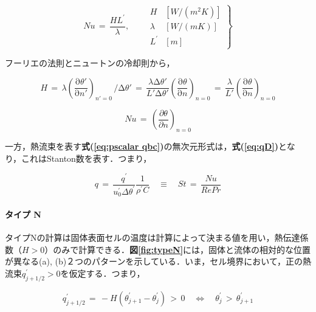 \begin{equation}
Nu \,=\, \frac{HL^{\prime}}{\lambda}, \qquad \left.
\begin{array}{ll}
H & [W/(m^2K)]\\
\lambda & [W/(mK)]\\
L^\prime & [m]
\end{array} \right\}
\label{eq:nu_1}
\end{equation}

フーリエの法則とニュートンの冷却則から，

\begin{equation}
{H} \,=\, \lambda {\left({\frac{\mathrm{\partial}{\mathit{\theta}}'}{\mathrm{\partial}{n}'}}\right)}_{{n}'\mathrm{{=}}{0}}\, \Bigg/ {\mathrm{\Delta}{\mathit{\theta}}'}
\,=\,
\frac{{\mathit{\lambda}}\mathrm{\Delta}{\mathit{\theta}}'}{{L}'\mathrm{\Delta}{\mathit{\theta}}'}{\left({\frac{\mathrm{\partial}\mathit{\theta}}{\mathrm{\partial}{n}}}\right)}_{{n}\mathrm{{=}}{0}}
\,=\,
\frac{{\mathit{\lambda}}}{{L}'}{\left({\frac{\mathrm{\partial}\mathit{\theta}}{\mathrm{\partial}{n}}}\right)}_{{n}\mathrm{{=}}{0}}
\label{eq:nu_2}
\end{equation}

\begin{equation}
Nu \,=\, \left( \frac{\partial \theta}{\partial n} \right)_{n=0}
\label{eq:nu_3}
\end{equation}

一方，熱流束を表す\textbf{式(\ref{eq:pscalar qbc})}の無次元形式は，\textbf{式(\ref{eq:qD})}となり，これはStanton数を表す．つまり，

\begin{equation}
q \,=\, \frac{q^\prime}{u_{\mathit 0}^\prime \Delta \theta^\prime} \frac{1}{\rho^\prime C}
\quad \equiv \quad 
St\,=\, \frac{Nu}{Re Pr} 
\label{eq:stanton}
\end{equation}


%
\paragraph{タイプ N}
タイプNの計算は固体表面セルの温度は計算によって決まる値を用い，熱伝達係数（$H>0$）のみで計算できる．\textbf{図\ref{fig:typeN}}には，固体と流体の相対的な位置が異なる(a), (b)２つのパターンを示している．いま，セル境界において，正の熱流束$q_{j+1/2}^{\prime}>0$を仮定する．つまり，

\begin{equation}
q_{j+1/2}^{\prime}\,=\,-H(\theta_{j+1}^{\prime}-\theta_{j}^{\prime})\, >\,0 \quad \Longleftrightarrow \quad \theta_{j}^{\prime} \,>\, \theta_{j+1}^{\prime}
\label{eq:qT_N1}
\end{equation}

